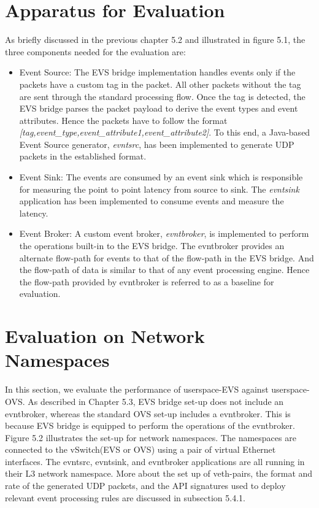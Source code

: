 \section{Apparatus for Evaluation}
As briefly discussed in the previous chapter 5.2 and illustrated in figure 5.1, the three components needed for the evaluation are:
\begin{itemize}
 \item Event Source: The EVS bridge implementation handles events only if the packets have a custom tag in the packet. All other packets without the tag are sent through the standard processing flow. Once the tag is detected, the EVS bridge parses the packet payload to derive the event types and event attributes. Hence the packets have to follow the  format \textit{[tag,event_type,event_attribute1,event_attribute2]}. To this end, a Java-based Event Source generator, \textit{evntsrc}, has been implemented to generate UDP packets in the established format.
  
 \item Event Sink: The events are consumed by an event sink which is responsible for measuring the point to point latency from source to sink. The \textit{evntsink} application has been implemented to consume events and measure the latency.
 
 \item Event Broker: A custom event broker, \textit{evntbroker}, is implemented to perform the operations built-in to the EVS bridge. The evntbroker provides an alternate flow-path for events to that of the flow-path in the EVS bridge. And the flow-path of data is similar to that of any event processing engine. Hence the flow-path provided by evntbroker is referred to as a baseline for evaluation.
\end{itemize}

\section{Evaluation on Network Namespaces}
In this section, we evaluate the performance of userspace-EVS against userspace-OVS. As described in Chapter 5.3, EVS bridge set-up does not include an evntbroker, whereas the standard OVS set-up includes a evntbroker. This is because EVS bridge is equipped to perform the operations of the evntbroker. Figure 5.2 illustrates the set-up for network namespaces. The namespaces are connected to the vSwitch(EVS or OVS) using a pair of virtual Ethernet interfaces. The evntsrc, evntsink, and evntbroker applications are all running in their L3 network namespace. More about the set up of veth-pairs, the format and rate of the generated UDP packets, and the API signatures used to deploy relevant event processing rules are discussed in subsection 5.4.1.

